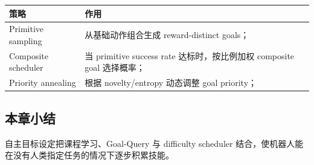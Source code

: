 \begin{tabularx}{\textwidth}{lX}
\toprule
策略 & 作用 \\
\midrule
Primitive sampling & 从基础动作组合生成 reward-distinct goals； \\
Composite scheduler & 当 primitive success rate 达标时，按比例加权 composite goal 选择概率； \\
Priority annealing & 根据 novelty/entropy 动态调整 goal priority； \\
\bottomrule
\end{tabularx}

\subsection{本章小结}
自主目标设定把课程学习、Goal-Query 与 difficulty scheduler 结合，使机器人能在没有人类指定任务的情况下逐步积累技能。
\newpage

